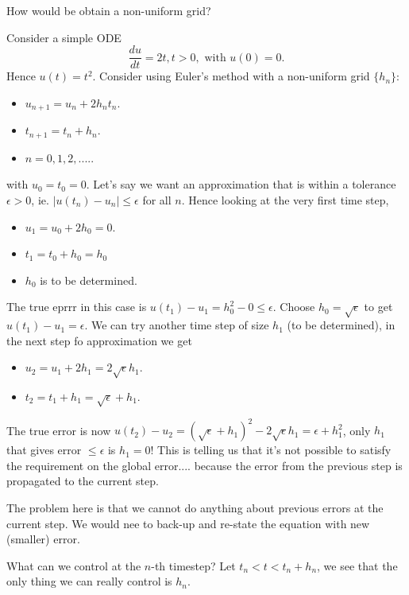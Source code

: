 \documentclass{article}
\begin{document}
How would be obtain a non-uniform grid?
\begin{example}
    Consider a simple ODE
    \[\frac{du}{dt} = 2t, t > 0, \text{ with } u(0) = 0.\]
    Hence $u(t) = t^2$. Consider using Euler's method with a non-uniform grid $\{h_n\}$:
    \begin{itemize}
        \item $u_{n+1} = u_{n} + 2 h_n t_n$.
        \item $t_{n+1} = t_n + h_n$.
        \item $n = 0, 1, 2, ....$.
    \end{itemize}
    with $u_0 = t_0 = 0$. Let's say we want an approximation that is within a tolerance $\epsilon > 0$, ie. $|u(t_n) - u_n| \leq \epsilon$ for all $n$. Hence looking at the very first time step,
    \begin{itemize}
        \item $u_1 = u_0 + 2 h_0 = 0$.
        \item $t_1 = t_0 + h_0 = h_0$
        \item $h_0$ is to be determined.
    \end{itemize}
    The true eprrr in this case is $u(t_1) - u_1 = h_0^2 - 0 \leq \epsilon$. Choose $h_0 = \sqrt{\epsilon}$ to get $u(t_1) - u_1 = \epsilon$. We can try another time step of size $h_1$ (to be determined), in the next step fo approximation we get
    \begin{itemize}
        \item $u_2 = u_1 + 2 h_1 = 2 \sqrt{\epsilon} h_1$.
        \item $t_2 = t_1 + h_1 = \sqrt{\epsilon} + h_1$.
    \end{itemize}
    The true error is now $u(t_2) - u_2 = (\sqrt{\epsilon} + h_1)^2 - 2 \sqrt{\epsilon} h_1 = \epsilon + h_1^2$, only $h_1$ that gives error $\leq \epsilon$ is $h_1 = 0$! This is telling us that it's not possible to satisfy the requirement on the global error.... because the error from the previous step is propagated to the current step.
\end{example}

The problem here is that we cannot do anything about previous errors at the current step. We would nee to back-up and re-state the equation with new (smaller) error.

\begin{question}
    What can we control at the $n$-th timestep? Let $t_n < t < t_n + h_n$, we see that the only thing we can really control is $h_n$.
\end{question}
\end{document}
